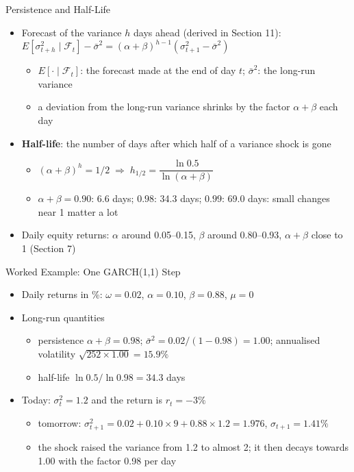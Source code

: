 \begin{frame}{Persistence and Half-Life}
\itemsize{\small}
\begin{itemize}
    \item Forecast of the variance $h$ days ahead (derived in Section 11): $E[\sigma_{t+h}^2 \mid \mathcal{F}_t] - \bar\sigma^2 = (\alpha + \beta)^{h-1}(\sigma_{t+1}^2 - \bar\sigma^2)$
    \begin{itemize}
        \item $E[\cdot \mid \mathcal{F}_t]$: the forecast made at the end of day $t$; $\bar\sigma^2$: the long-run variance
        \item a deviation from the long-run variance shrinks by the factor $\alpha + \beta$ each day
    \end{itemize}
    \item \textbf{Half-life}: the number of days after which half of a variance shock is gone
    \begin{itemize}
        \item $(\alpha + \beta)^{h} = 1/2 \;\Rightarrow\; h_{1/2} = \dfrac{\ln 0.5}{\ln(\alpha + \beta)}$
        \item $\alpha + \beta = 0.90$: 6.6 days; $0.98$: 34.3 days; $0.99$: 69.0 days: small changes near 1 matter a lot
    \end{itemize}
    \item Daily equity returns: $\alpha$ around 0.05--0.15, $\beta$ around 0.80--0.93, $\alpha + \beta$ close to 1 (Section 7)
\end{itemize}
\end{frame}

\begin{frame}{Worked Example: One GARCH(1,1) Step}
\itemsize{\small}
\begin{itemize}
    \item Daily returns in \%: $\omega = 0.02$, $\alpha = 0.10$, $\beta = 0.88$, $\mu = 0$
    \item Long-run quantities
    \begin{itemize}
        \item persistence $\alpha + \beta = 0.98$; $\bar\sigma^2 = 0.02/(1 - 0.98) = 1.00$; annualised volatility $\sqrt{252 \times 1.00} = 15.9\%$
        \item half-life $\ln 0.5/\ln 0.98 = 34.3$ days
    \end{itemize}
    \item Today: $\sigma_t^2 = 1.2$ and the return is $r_t = -3\%$
    \begin{itemize}
        \item tomorrow: $\sigma_{t+1}^2 = 0.02 + 0.10 \times 9 + 0.88 \times 1.2 = 1.976$, $\sigma_{t+1} = 1.41\%$
        \item the shock raised the variance from 1.2 to almost 2; it then decays towards 1.00 with the factor 0.98 per day
    \end{itemize}
\end{itemize}
\end{frame}

